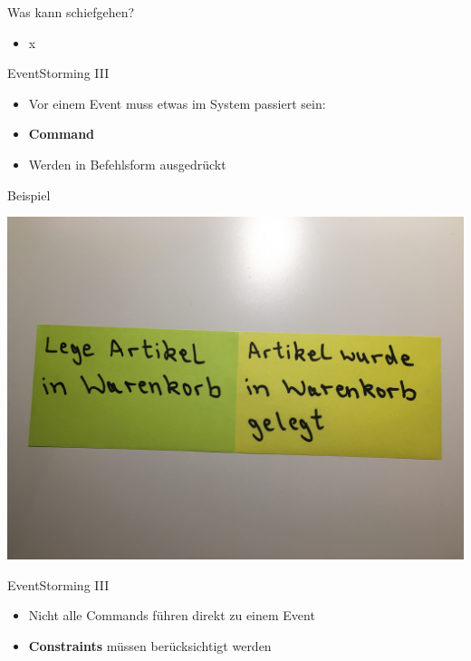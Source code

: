 \begin{frame}[fragile]{Was kann schiefgehen?}

\begin{itemize}
\item x
\end{itemize}

\end{frame}

\begin{frame}[fragile]{EventStorming III}

\begin{itemize}
\item Vor einem Event muss etwas im System passiert sein:
\item \textbf{Command}
\item Werden in Befehlsform ausgedrückt
\end{itemize}

\end{frame}

\begin{frame}[fragile]{Beispiel}

\begin{center}
\includegraphics[width=.7\textwidth]{pics/eventstorming2.jpg}
\end{center}

\end{frame}


\begin{frame}[fragile]{EventStorming III}

\begin{itemize}
\item Nicht alle Commands führen direkt zu einem Event
\item \textbf{Constraints} müssen berücksichtigt werden
\end{itemize}

\end{frame}

